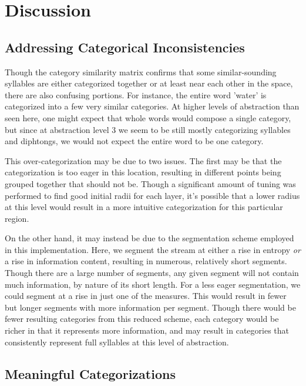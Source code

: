 \section{Discussion}
\label{section:discussion}

\subsection{Addressing Categorical Inconsistencies}
\label{section:addressing-categorical-inconsistencies}

Though the category similarity matrix confirms that some similar-sounding syllables are either categorized together or at least near each other in the space, there are also confusing portions.  For instance, the entire word 'water' is categorized into a few very similar categories.  At higher levels of abstraction than seen here, one might expect that whole words would compose a single category, but since at abstraction level 3 we seem to be still mostly categorizing syllables and diphtongs, we would not expect the entire word to be one category.

This over-categorization may be due to two issues.  The first may be that the categorization is too eager in this location, resulting in different points being grouped together that should not be.  Though a significant amount of tuning was performed to find good initial radii for each layer, it's possible that a lower radius at this level would result in a more intuitive categorization for this particular region.

On the other hand, it may instead be due to the segmentation scheme employed in this implementation.  Here, we segment the stream at either a rise in entropy \textit{or} a rise in information content, resulting in numerous, relatively short segments.  Though there are a large number of segments, any given segment will not contain much information, by nature of its short length.  For a less eager segmentation, we could segment at a rise in just one of the measures.  This would result in fewer but longer segments with more information per segment. Though there would be fewer resulting categories from this reduced scheme, each category would be richer in that it represents more information, and may result in categories that consistently represent full syllables at this level of abstraction.

\subsection{Meaningful Categorizations}
\label{section:meaningful-categorizations}

